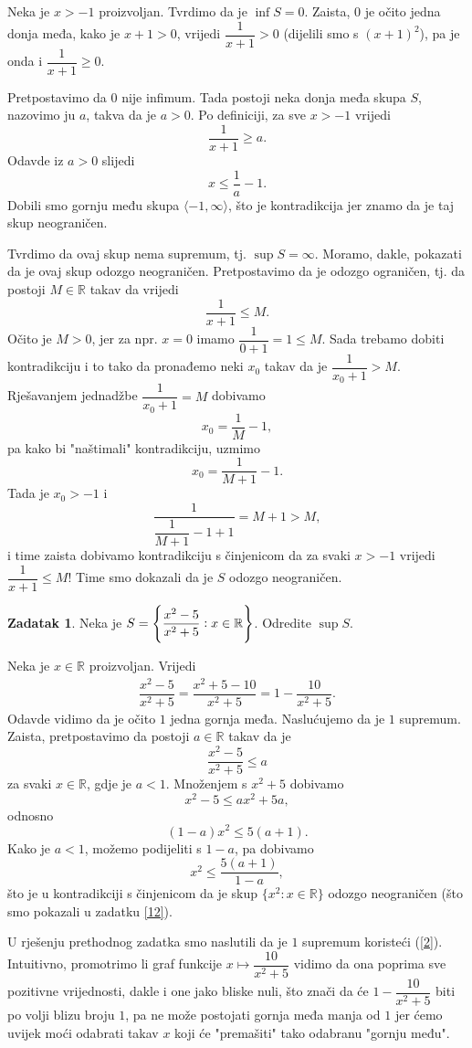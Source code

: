 \documentclass{book}
\let\originalleft\left
\let\originalright\right
\renewcommand{\left}{\mathopen{}\mathclose\bgroup\originalleft}
\renewcommand{\right}{\aftergroup\egroup\originalright}
\renewenvironment{proof}{%
    \vspace{-\parskip}\begin{oldproof}%
    }{%
    \end{oldproof}%
}
\theoremstyle{definition}
\theoremstyle{definition}
\newtheorem{exercise}{Zadatak}
\theoremstyle{remark}
\begin{document}
\begin{proof}[Rješenje]
Neka je $x>-1$ proizvoljan. Tvrdimo da je $\inf{S}=0$. Zaista, $0$ je očito jedna donja međa, kako je $x+1>0$, vrijedi $\dfrac{1}{x+1}>0$ (dijelili smo s $(x+1)^2$), pa je onda i $\dfrac{1}{x+1}\geq 0.$ 

Pretpostavimo da $0$ nije infimum. Tada postoji neka donja međa skupa $S$, nazovimo ju $a$, takva da je $a>0$. Po definiciji, za sve $x>-1$ vrijedi $$\dfrac{1}{x+1}\geq a.$$ Odavde iz $a>0$ slijedi $$x\leq \dfrac{1}{a}-1.$$ 
Dobili smo gornju među skupa $\langle-1, \infty\rangle$, što je kontradikcija jer znamo da je taj skup neograničen.

Tvrdimo da ovaj skup nema supremum, tj. $\sup{S}=\infty$. Moramo, dakle, pokazati da je ovaj skup odozgo neograničen. Pretpostavimo da je odozgo ograničen, tj. da postoji $M\in \mathbb{R}$ takav da vrijedi 
$$\dfrac{1}{x+1}\leq M.$$
Očito je $M>0$, jer za npr. $x=0$ imamo $\dfrac{1}{0+1}=1\leq M$. Sada trebamo dobiti kontradikciju i to tako da pronađemo neki $x_0$ takav da je $\dfrac{1}{x_0+1}>M$. Rješavanjem jednadžbe $\dfrac{1}{x_0+1}=M$ dobivamo $$x_0=\dfrac{1}{M}-1,$$ pa kako bi "naštimali" kontradikciju, uzmimo 
$$x_0=\dfrac{1}{M+1}-1.$$ 
Tada je $x_0>-1$ i
$$\dfrac{1}{\dfrac{1}{M+1}-1+1}=M+1>M,$$ i time zaista dobivamo kontradikciju s činjenicom da za svaki $x> -1$ vrijedi $\dfrac{1}{x+1}\leq M$! Time smo dokazali da je $S$ odozgo neograničen.
\end{proof}
\begin{exercise}
\label{11}
Neka je $S=\left\{\dfrac{x^2-5}{x^2+5} : x\in \mathbb{R}\right\}$. Odredite $\sup{S}$.
\end{exercise}
\begin{proof}[Rješenje]
Neka je $x\in \mathbb{R}$ proizvoljan. Vrijedi
\begin{gather}
\label{2}
\dfrac{x^2-5}{x^2+5}=\dfrac{x^2+5-10}{x^2+5}=1-\dfrac{10}{x^2+5}.
\end{gather}
Odavde vidimo da je očito $1$ jedna gornja međa. Naslućujemo da je $1$ supremum. Zaista, pretpostavimo da postoji $a\in \mathbb{R}$ takav da je $$\dfrac{x^2-5}{x^2+5}\leq a$$ za svaki $x\in \mathbb{R}$, gdje je $a<1$. Množenjem s $x^2+5$ dobivamo $$x^2-5\leq ax^2+5a,$$ odnosno $$(1-a)x^2\leq 5(a+1).$$ Kako je $a<1$, možemo podijeliti s $1-a$, pa dobivamo $$x^2\leq \dfrac{5(a+1)}{1-a},$$
što je u kontradikciji s činjenicom da je skup $\{x^2 : x\in \mathbb{R}\}$ odozgo neograničen (što smo pokazali u zadatku \ref{12}).
\end{proof}
U rješenju prethodnog zadatka smo naslutili da je $1$ supremum koristeći (\ref{2}). Intuitivno, promotrimo li graf funkcije $x\mapsto \dfrac{10}{x^2+5}$ vidimo da ona poprima sve pozitivne vrijednosti, dakle i one jako bliske nuli, što znači da će $1-\dfrac{10}{x^2+5}$ biti po volji blizu broju $1$, pa ne može postojati gornja međa manja od $1$ jer ćemo uvijek moći odabrati takav $x$ koji će "premašiti" tako odabranu "gornju među".
\end{document}
